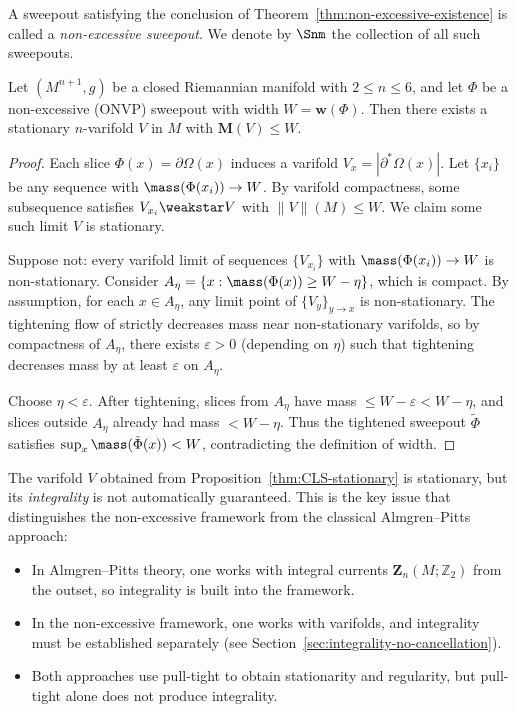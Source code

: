 A sweepout satisfying the conclusion of Theorem~\ref{thm:non-excessive-existence} is called a \emph{non-excessive sweepout}. We denote by $\Snm$ the collection of all such sweepouts.

\begin{proposition}\label{thm:CLS-stationary}
Let $(M^{n+1},g)$ be a closed Riemannian manifold with $2\leq n\leq 6$, and let $\Phi$ be a non-excessive (ONVP) sweepout with width $W = \mathbf{w}(\Phi)$. Then there exists a stationary $n$-varifold $V$ in $M$ with $\mathbf{M}(V) \leq W$.
\end{proposition}

\begin{proof}
Each slice $\Phi(x) = \partial\Omega(x)$ induces a varifold $V_x = |\partial^*\Omega(x)|$. Let $\{x_i\}$ be any sequence with $\mass(\Phi(x_i)) \to W$. By varifold compactness, some subsequence satisfies $V_{x_i} \weakstar V$ with $\|V\|(M) \leq W$. We claim some such limit $V$ is stationary.

Suppose not: every varifold limit of sequences $\{V_{x_i}\}$ with $\mass(\Phi(x_i)) \to W$ is non-stationary. Consider $A_\eta = \{x : \mass(\Phi(x)) \geq W - \eta\}$, which is compact. By assumption, for each $x \in A_\eta$, any limit point of $\{V_y\}_{y \to x}$ is non-stationary. The tightening flow of \cite{CL03} strictly decreases mass near non-stationary varifolds, so by compactness of $A_\eta$, there exists $\varepsilon > 0$ (depending on $\eta$) such that tightening decreases mass by at least $\varepsilon$ on $A_\eta$.

Choose $\eta < \varepsilon$. After tightening, slices from $A_\eta$ have mass $\leq W - \varepsilon < W - \eta$, and slices outside $A_\eta$ already had mass $< W - \eta$. Thus the tightened sweepout $\tilde{\Phi}$ satisfies $\sup_x \mass(\tilde{\Phi}(x)) < W$, contradicting the definition of width.
\end{proof}

\begin{remark}
The varifold $V$ obtained from Proposition~\ref{thm:CLS-stationary} is stationary, but its \emph{integrality} is not automatically guaranteed. This is the key issue that distinguishes the non-excessive framework from the classical Almgren--Pitts approach:
\begin{itemize}
    \item In Almgren--Pitts theory, one works with integral currents $\mathbf{Z}_n(M;\mathbb{Z}_2)$ from the outset, so integrality is built into the framework.
    \item In the non-excessive framework, one works with varifolds, and integrality must be established separately (see Section~\ref{sec:integrality-no-cancellation}).
    \item Both approaches use pull-tight to obtain stationarity and regularity, but pull-tight alone does not produce integrality.
\end{itemize}
\end{remark}

